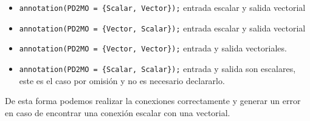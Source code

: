 \begin{itemize}
\item \texttt{annotation(PD2MO = \{Scalar, Vector\});} entrada escalar y salida vectorial
\item \texttt{annotation(PD2MO = \{Vector, Scalar\});} entrada escalar y salida vectorial
\item \texttt{annotation(PD2MO = \{Vector, Vector\});} entrada y salida vectoriales.
\item \texttt{annotation(PD2MO = \{Scalar, Scalar\});} entrada y salida son escalares, este es el caso por omisión y no es necesario declararlo.
\end{itemize}

	De esta forma podemos realizar la conexiones correctamente y generar un error en caso de encontrar una conexión escalar con una vectorial. 

